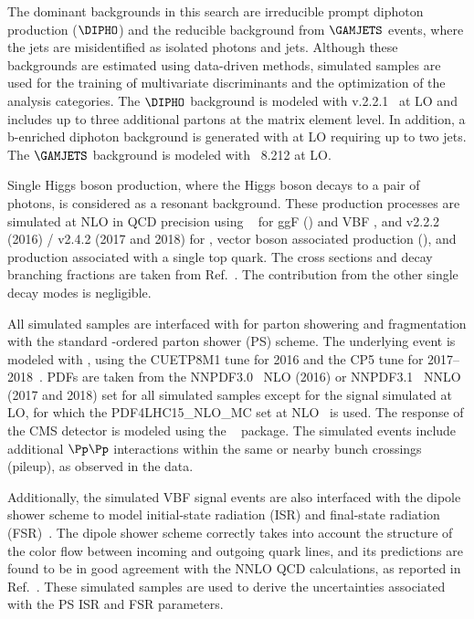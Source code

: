 \documentclass[11pt,a4paper,cmspaper,final,collab]{cms-tdr}
\begin{document}
The dominant backgrounds in this search are irreducible prompt diphoton production ($\DIPHO$) and the reducible background from $\GAMJETS$ events, where the jets are misidentified as isolated photons and {\cPqb} jets. Although these backgrounds are estimated using data-driven methods, simulated samples are used for the training of multivariate discriminants and the optimization of the analysis categories. The $\DIPHO$ background is modeled with \SHERPA
v.2.2.1~\cite{Gleisberg:2008ta} at LO and includes up to three additional
partons at the matrix element level. In addition, a b-enriched diphoton background is generated with \SHERPA at LO requiring up to two {\cPqb} jets.
The $\GAMJETS$ background is modeled with \PYTHIA~8.212 \cite{Sjostrand:2014zea} at LO.

Single Higgs boson production, where the Higgs boson decays to a pair of photons, is considered as a resonant background. These production processes are simulated at NLO in QCD precision using ~\cite{Nason:2004rx, POWHEG_Frixione:2007vw, Alioli:2010xd, Bagnaschi:2011tu} for ggF \PH (\ggH) and VBF \PH, and \MGvATNLO v2.2.2 (2016) / v2.4.2 (2017 and 2018) for \ttH, vector boson associated production (\VH), and production associated with a single top quark. The cross sections and decay branching fractions are
taken from Ref.~\cite{deFlorian:2016spz}. The contribution from the other single \PH decay modes is negligible.  

All simulated samples are interfaced with \PYTHIA for parton showering and fragmentation with the standard \pt-ordered parton shower (PS) scheme. The underlying event is modeled with \PYTHIA, using the CUETP8M1 tune for 2016 and the CP5 tune for 2017--2018~\cite{Khachatryan:2015pea, Sirunyan:2019dfx}. PDFs are taken from the NNPDF3.0~\cite{Ball:2014uwa} NLO (2016) or NNPDF3.1~\cite{Ball:2017} NNLO (2017 and 2018) set for all simulated samples except for the signal simulated at LO, for which the {PDF4LHC15\_NLO\_MC} set at NLO~\cite{Carrazza:2015hva, Butterworth:2015oua, Dulat:2015mca, Harland-Lang:2014zoa, Ball:2014uwa} is used. The response of the CMS detector is modeled using the \GEANTfour~\cite{Agostinelli:2002hh} package. The simulated events include additional $\Pp\Pp$ interactions within the same or nearby bunch crossings (pileup), as observed in the data.

Additionally, the simulated VBF \HH signal events are also interfaced with the \PYTHIA dipole shower scheme to model initial-state radiation (ISR) and final-state radiation (FSR)~\cite{Cabouat_2018}. The dipole shower scheme correctly takes into account the structure of the color flow between incoming and outgoing quark lines, and its predictions are found to be in good agreement with the NNLO QCD calculations, as reported in Ref.~\cite{Jager:2020hkz}. These simulated samples are used to derive the uncertainties associated with the \PYTHIA PS ISR and FSR parameters.
\end{document}

